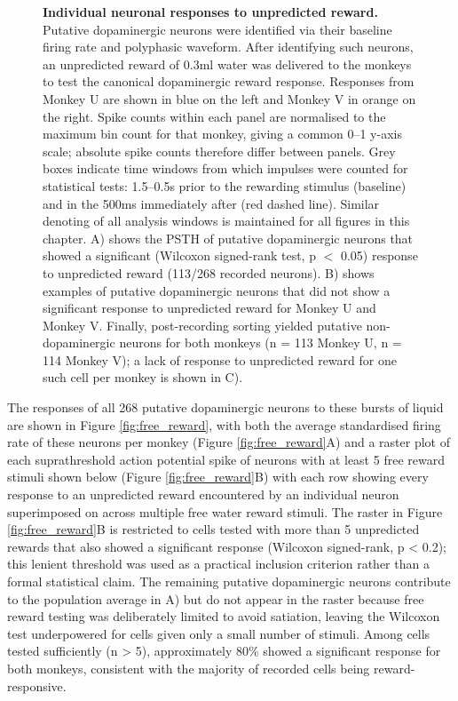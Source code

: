 \begin{figure}[p]
\centering    

\caption[Individual neuronal responses to unpredicted reward.]{\textbf{Individual neuronal responses to unpredicted reward.} Putative dopaminergic neurons were identified via their baseline firing rate and polyphasic waveform. After identifying such neurons, an unpredicted reward of 0.3ml water was delivered to the monkeys to test the canonical dopaminergic reward response. Responses from Monkey U are shown in blue on the left and Monkey V in orange on the right. Spike counts within each panel are normalised to the maximum bin count for that monkey, giving a common 0--1 y-axis scale; absolute spike counts therefore differ between panels. Grey boxes indicate time windows from which impulses were counted for statistical tests: 1.5--0.5s prior to the rewarding stimulus (baseline) and in the 500ms immediately after (red dashed line). Similar denoting of all analysis windows is maintained for all figures in this chapter. A) shows the PSTH of putative dopaminergic neurons that showed a significant (Wilcoxon signed-rank test, p $<$ 0.05) response to unpredicted reward (113/268 recorded neurons). B) shows examples of putative dopaminergic neurons that did not show a significant response to unpredicted reward for Monkey U and Monkey V. Finally, post-recording sorting yielded putative non-dopaminergic neurons for both monkeys (n = 113 Monkey U, n = 114 Monkey V); a lack of response to unpredicted reward for one such cell per monkey is shown in C).}
\label{fig:free_reward_psth}
\end{figure}

The responses of all 268 putative dopaminergic neurons to these bursts of liquid are shown in Figure \ref{fig:free_reward}, with both the average standardised firing rate of these neurons per monkey (Figure \ref{fig:free_reward}A) and a raster plot of each suprathreshold action potential spike of neurons with at least 5 free reward stimuli shown below (Figure \ref{fig:free_reward}B) with each row showing every response to an unpredicted reward encountered by an individual neuron superimposed on across multiple free water reward stimuli. The raster in Figure \ref{fig:free_reward}B is restricted to cells tested with more than 5 unpredicted rewards that also showed a significant response (Wilcoxon signed-rank, p < 0.2); this lenient threshold was used as a practical inclusion criterion rather than a formal statistical claim. The remaining putative dopaminergic neurons contribute to the population average in A) but do not appear in the raster because free reward testing was deliberately limited to avoid satiation, leaving the Wilcoxon test underpowered for cells given only a small number of stimuli. Among cells tested sufficiently (n > 5), approximately 80\% showed a significant response for both monkeys, consistent with the majority of recorded cells being reward-responsive.

